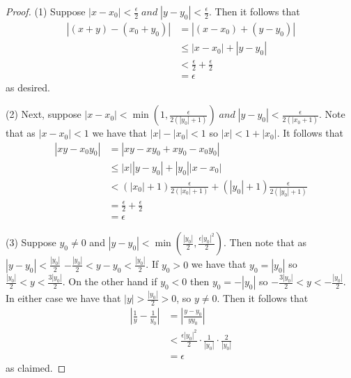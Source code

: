 \documentclass[12pt, a4paper, oneside, openright, titlepage]{book}
\begin{document}
\begin{proof}
    (1) Suppose $|x-x_0| < \frac{\epsilon}{2}\;and\;|y-y_0| < \frac{\epsilon}{2}$. Then it follows that \begin{align*}
        |(x+y) - (x_0+y_0)| &= |(x-x_0)+(y-y_0)| \\
        &\leq |x-x_0| + |y-y_0| \\
        &< \frac{\epsilon}{2} + \frac{\epsilon}{2} \\
        &= \epsilon
    \end{align*}
    as desired.


    (2) Next, suppose $|x-x_0| < \min\left(1,\frac{\epsilon}{2(|y_0|+1)}\right)\;and\;|y-y_0| < \frac{\epsilon}{2(|x_0+1)}$. Note that as $|x-x_0| < 1$ we have that $|x| - |x_0| < 1$ so $|x| < 1+|x_0|$. It follows that \begin{align*}
        |xy-x_0y_0| &= |xy-xy_0+xy_0-x_0y_0| \\
        &\leq |x||y-y_0| + |y_0||x-x_0| \\
        &< (|x_0|+1)\frac{\epsilon}{2(|x_0|+1)} + (|y_0| + 1)\frac{\epsilon}{2(|y_0|+1)} \\
        &= \frac{\epsilon}{2} + \frac{\epsilon}{2} \\
        &= \epsilon
    \end{align*}


    (3) Suppose $y_0 \neq 0$ and $|y-y_0| < \min\left(\frac{|y_0|}{2},\frac{\epsilon|y_0|^2}{2}\right)$. Then note that as $|y-y_0| < \frac{|y_0|}{2}$ $-\frac{|y_0|}{2} < y-y_0 < \frac{|y_0|}{2}$. If $y_0 > 0$ we have that $y_0 = |y_0|$ so $\frac{|y_0|}{2} < y < \frac{3|y_0|}{2}$. On the other hand if $y_0 < 0$ then $y_0 = -|y_0|$ so $-\frac{3|y_0|}{2} < y < -\frac{|y_0|}{2}$. In either case we have that $|y| > \frac{|y_0|}{2} > 0$, so $y \neq 0$. Then it follows that \begin{align*}
        \left|\frac{1}{y} - \frac{1}{y_0}\right| &= \left|\frac{y - y_0}{yy_0}\right| \\
        &< \frac{\epsilon|y_0|^2}{2}\cdot \frac{1}{|y_0|}\cdot \frac{2}{|y_0|} \\
        &= \epsilon
    \end{align*}
    as claimed.
\end{proof}
\end{document}
